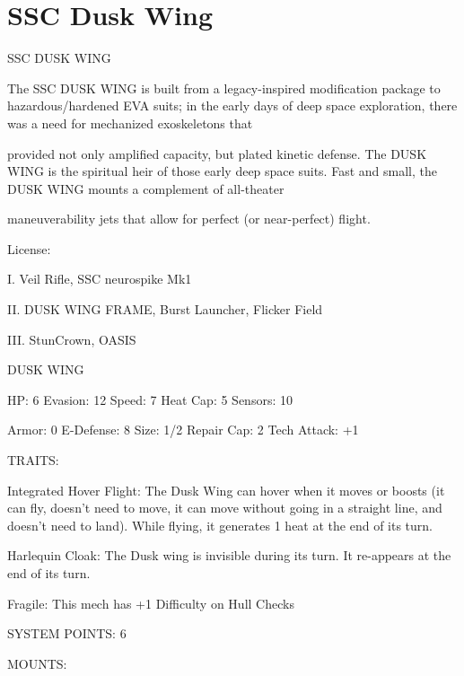 \section{SSC Dusk Wing}

                                           SSC DUSK WING  

The SSC DUSK WING is built from a legacy-inspired modification package to hazardous/hardened EVA  
suits; in the early days of deep space exploration, there was a need for mechanized exoskeletons that  

provided not only amplified capacity, but plated kinetic defense. The DUSK WING is the spiritual heir of  
those early deep space suits. Fast and small, the DUSK WING mounts a complement of all-theater  

maneuverability jets that allow for perfect (or near-perfect) flight.    

                                                    License:
 
I. Veil Rifle, SSC neurospike Mk1
 
II. DUSK WING FRAME, Burst Launcher, Flicker Field
 
III. StunCrown, OASIS
 

                                                 DUSK WING 

  HP: 6           Evasion: 12                           Speed: 7            Heat Cap: 5        Sensors: 10 

  Armor: 0        E-Defense: 8                          Size: 1/2           Repair Cap: 2      Tech Attack:  
                                                                                               +1 

                                                     TRAITS: 

  Integrated Hover Flight: The Dusk Wing can hover when it moves or boosts (it can fly, doesn’t need to  
  move, it can move without going in a straight line, and doesn’t need to land). While flying, it generates 1  
  heat at the end of its turn.
 
  Harlequin Cloak: The Dusk wing is invisible during its turn. It re-appears at the end of its turn.
 
  Fragile: This mech has +1 Difficulty on Hull Checks 

                                              SYSTEM POINTS: 6 

                                                    MOUNTS: 

